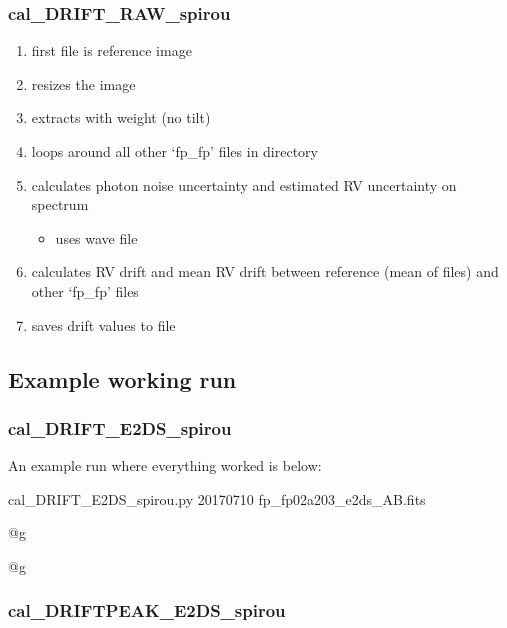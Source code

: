 \subsubsection{cal\_DRIFT\_RAW\_spirou}
\begin{enumerate}
	\item first file is reference image
	\item resizes the image
	\item extracts with weight (no tilt)
	\item loops around all other `fp\_fp' files in directory
	\item calculates photon noise uncertainty and estimated RV uncertainty on spectrum
	\begin{itemize}
		\item uses wave file
	\end{itemize}
	\item calculates RV drift and mean RV drift between reference (mean of files) and other `fp\_fp' files
	\item saves drift values to file
\end{enumerate}


\newpage
\subsection{Example working run}

\subsubsection{cal\_DRIFT\_E2DS\_spirou}

An example run where everything worked is below:
\begin{cmdbox}[title={example}]
cal_DRIFT_E2DS_spirou.py 20170710 fp_fp02a203_e2ds_AB.fits
\end{cmdbox}
\begin{cmdboxprintspecial}[fontupper=\tiny, fontlower=\tiny]
@g

@g
\end{cmdboxprintspecial}



\subsubsection{cal\_DRIFTPEAK\_E2DS\_spirou}

